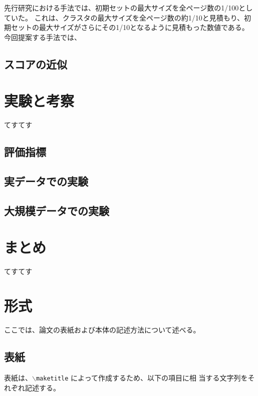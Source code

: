 \documentclass[a4paper,11pt]{jreport}
\begin{document}
先行研究における手法では、初期セットの最大サイズを全ページ数の1/100としていた。
これは、クラスタの最大サイズを全ページ数の約1/10と見積もり、初期セットの最大サイズがさらにその1/10となるように見積もった数値である。
今回提案する手法では、

\newpage

\section{スコアの近似}

\chapter{実験と考察}

てすてす

\section{評価指標}
\section{実データでの実験}
\section{大規模データでの実験}

\chapter{まとめ}

てすてす

\chapter{形式}

ここでは、論文の表紙および本体の記述方法について述べる。

\section{表紙}

表紙は、{\tt $\backslash$maketitle} によって作成するため、以下の項目に相
当する文字列をそれぞれ記述する。
\end{document}
